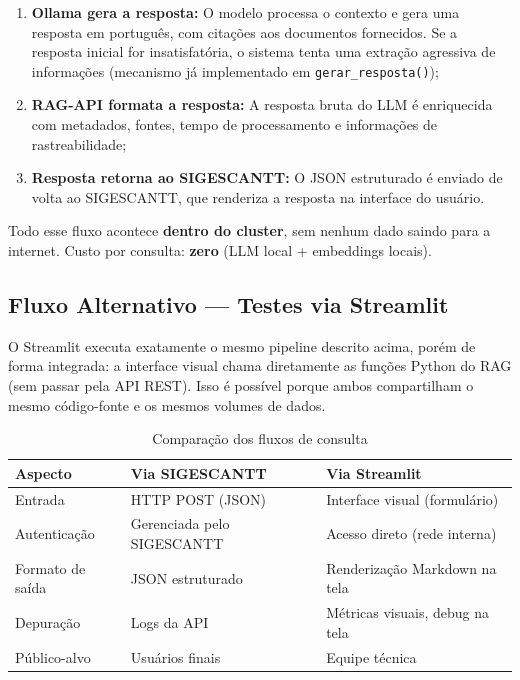 \documentclass[12pt, a4paper]{article}
\begin{document}
\begin{enumerate}[label=\textbf{Passo~\arabic*.}]
  \item \textbf{Ollama gera a resposta:} O modelo processa o contexto e gera uma resposta em português, com citações aos documentos fornecidos. Se a resposta inicial for insatisfatória, o sistema tenta uma extração agressiva de informações (mecanismo já implementado em \texttt{gerar\_resposta()});

  \item \textbf{RAG-API formata a resposta:} A resposta bruta do LLM é enriquecida com metadados, fontes, tempo de processamento e informações de rastreabilidade;

  \item \textbf{Resposta retorna ao SIGESCANTT:} O JSON estruturado é enviado de volta ao SIGESCANTT, que renderiza a resposta na interface do usuário.
\end{enumerate}

\noindent Todo esse fluxo acontece \textbf{dentro do cluster}, sem nenhum dado saindo para a internet. Custo por consulta: \textbf{zero} (LLM local + embeddings locais).

\subsection{Fluxo Alternativo --- Testes via Streamlit}

O Streamlit executa exatamente o mesmo pipeline descrito acima, porém de forma integrada: a interface visual chama diretamente as funções Python do RAG (sem passar pela API REST). Isso é possível porque ambos compartilham o mesmo código-fonte e os mesmos volumes de dados.

\begin{table}[H]
\centering
\small
\caption{Comparação dos fluxos de consulta}
\label{tab:fluxos}
\begin{tabularx}{\textwidth}{l X X}
\toprule
\textbf{Aspecto} & \textbf{Via SIGESCANTT} & \textbf{Via Streamlit} \\
\midrule
Entrada & HTTP POST (JSON) & Interface visual (formulário) \\
Autenticação & Gerenciada pelo SIGESCANTT & Acesso direto (rede interna) \\
Formato de saída & JSON estruturado & Renderização Markdown na tela \\
Depuração & Logs da API & Métricas visuais, debug na tela \\
Público-alvo & Usuários finais & Equipe técnica \\
\bottomrule
\end{tabularx}
\end{table}
\end{document}
